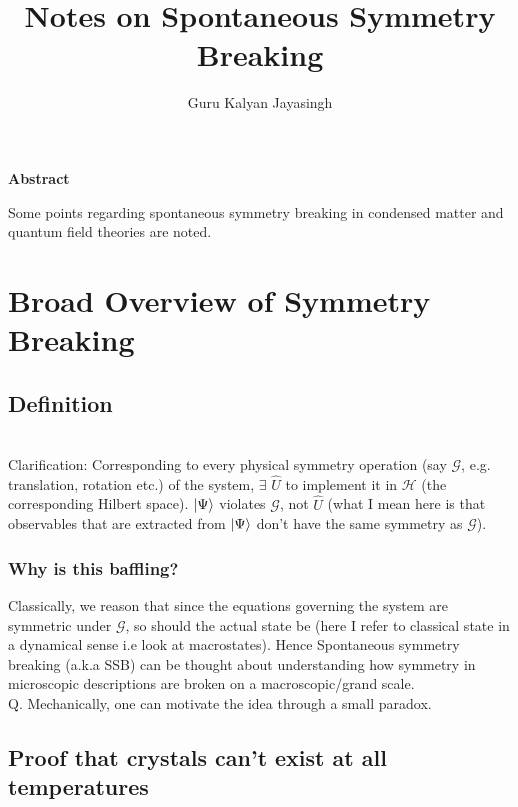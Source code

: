 \documentclass[12pt]{article}
\title{\Huge{Notes on Spontaneous Symmetry Breaking}}
\author{\Large{Guru Kalyan Jayasingh}}
\date{\phantom}
\begin{document}
\maketitle

\hline
\begin{center}
    \bf{Abstract}
\end{center}
Some points regarding spontaneous symmetry breaking in condensed matter and quantum field theories are noted.

\tableofcontents


\large
\section{Broad Overview of Symmetry Breaking}

\subsection{Definition}

\noindent{}
\\

Clarification: Corresponding to every physical symmetry operation (say $\mathcal{G}$, e.g. translation, rotation etc.) of the system, $\exists$ $\hat{U}$ to implement it in $\mathscr{H}$ (the corresponding Hilbert space).
$\ket{\Psi}$ violates $\mathcal{G}$, not $\hat{U}$ (what I mean here is that observables that are extracted from $\ket{\Psi}$ don't have the same symmetry as $\mathcal{G}$).
\subsubsection{Why is this baffling?}

Classically, we reason that since the equations governing the system are symmetric under $\mathcal{G}$, so should the actual state be (here I refer to classical state in a dynamical sense i.e look at macrostates). Hence Spontaneous symmetry breaking (a.k.a SSB) can be thought about understanding how symmetry in microscopic descriptions are broken on a macroscopic/grand scale.\\
Q. Mechanically, one can motivate the idea through a small paradox.

\subsection{Proof that crystals can't exist at all temperatures}
\end{document}
